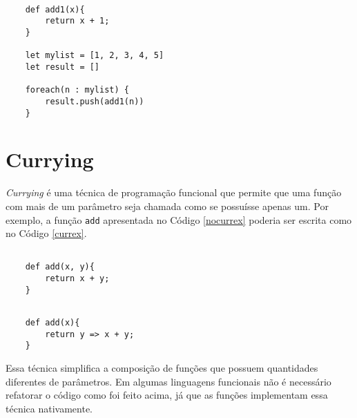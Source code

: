 \begin{lstlisting}[caption={Exemplo sem Funções de Alta Ordem. Fonte: O Autor (2021)},label=nohof]

    def add1(x){
        return x + 1;
    }

    let mylist = [1, 2, 3, 4, 5]
    let result = []

    foreach(n : mylist) {
        result.push(add1(n))
    }

\end{lstlisting}

\begin{comment}
Talvez a implementação da função map seja parecida 
com a função acima, porém, um programador que não 
conhece o programa levaria muito menos tempo para 
entender a primeira implementação do que a segunda. 
Além disso, para cada função diferente que poderia 
ser aplicada a essa mesma coleção, a mesma 
implementação teria que ser repetida.
\end{comment}



\section{Currying}

\textit{Currying} é uma técnica de programação funcional que 
permite que uma função com mais de um parâmetro seja 
chamada como se possuísse apenas um\cite{realworldhaskell, functionalscala}. 
Por exemplo, a função \texttt{add} apresentada no Código 
\ref{nocurrex} poderia ser escrita como no Código 
\ref{currex}.

\begin{lstlisting}[caption={Exemplo sem \textit{Currying}. Fonte: O Autor (2021)},label=nocurrex]

    def add(x, y){
        return x + y;
    }

\end{lstlisting}

\begin{lstlisting}[caption={Exemplo de \textit{Currying}. Fonte: O Autor (2021)},label=currex]

    def add(x){
        return y => x + y;
    }

\end{lstlisting}

Essa técnica simplifica a composição de funções 
que possuem quantidades diferentes de parâmetros. 
Em algumas linguagens funcionais não é 
necessário refatorar o código como foi feito 
acima, já que as funções implementam essa técnica 
nativamente\cite{realworldhaskell}.



